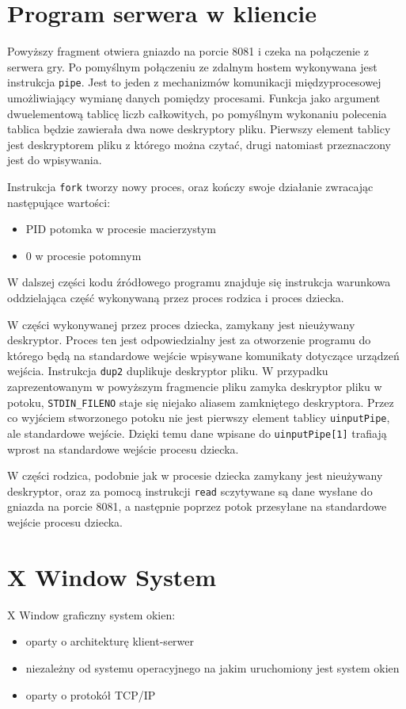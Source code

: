 \begin{appendices}
\section{Program serwera w kliencie}
\label{app:server_c}

Powyższy fragment otwiera gniazdo na porcie 8081 i czeka na połączenie z serwera gry. Po pomyślnym połączeniu ze zdalnym hostem wykonywana jest instrukcja \lstinline|pipe|. Jest to jeden z mechanizmów komunikacji międzyprocesowej umożliwiający wymianę danych pomiędzy procesami. Funkcja jako argument dwuelementową tablicę liczb całkowitych, po pomyślnym wykonaniu polecenia tablica będzie zawierała dwa nowe deskryptory pliku. Pierwszy element tablicy jest deskryptorem pliku z którego można czytać, drugi natomiast przeznaczony jest do wpisywania.
\par
Instrukcja \lstinline|fork| tworzy nowy proces, oraz kończy swoje działanie zwracając następujące wartości:
\par
\begin{itemize}
	\item PID potomka w procesie macierzystym
	\item 0 w procesie potomnym
\end{itemize}
\par
W dalszej części kodu źródłowego programu znajduje się instrukcja warunkowa oddzielająca część wykonywaną przez proces rodzica i proces dziecka. 
\par
W części wykonywanej przez proces dziecka, zamykany jest nieużywany deskryptor. Proces ten jest odpowiedzialny jest za otworzenie programu do którego będą na standardowe wejście wpisywane komunikaty dotyczące urządzeń wejścia. Instrukcja \lstinline|dup2| duplikuje deskryptor pliku. W przypadku zaprezentowanym w powyższym fragmencie pliku zamyka deskryptor pliku w potoku, \lstinline|STDIN_FILENO| staje się niejako aliasem zamkniętego deskryptora. Przez co wyjściem stworzonego potoku nie jest pierwszy element tablicy \lstinline|uinputPipe|, ale standardowe wejście. Dzięki temu dane wpisane do \lstinline|uinputPipe[1]| trafiają wprost na standardowe wejście procesu dziecka.
\par
W części rodzica, podobnie jak w procesie dziecka zamykany jest nieużywany deskryptor, oraz za pomocą instrukcji \lstinline|read| sczytywane są dane wysłane do gniazda na porcie 8081, a następnie poprzez potok przesyłane na standardowe wejście procesu dziecka.
		


\newpage
\section{X Window System}
\label{app:X Window System}
X Window graficzny system okien:
\begin{itemize}
	\item oparty o architekturę klient-serwer
	\item niezależny od systemu operacyjnego na jakim uruchomiony jest system okien
	\item oparty o protokół TCP/IP
\end{itemize}


\end{appendices}
